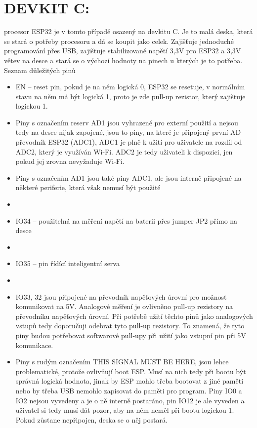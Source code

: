 \documentclass{template/socthesis}
\begin{document}
	\section{DEVKIT C:}
	procesor ESP32 je v tomto případě osazený na devkitu C. Je to malá deska, která se stará o potřeby procesoru a dá se koupit jako celek. Zajišťuje jednoduché programování přes USB, zajištuje stabilizované napětí 3,3V pro ESP32 a 3,3V větev na desce a stará se o výchozí hodnoty na pinech u kterých je to potřeba.
	Seznam důležitých pinů
	\begin{itemize}
	\item EN – reset pin, pokud je na něm logická 0, ESP32 se resetuje, v normálním stavu na něm má být logická 1, proto je zde pull-up rezistor, který zajištuje logickou 1.
	
	\item Piny s označením reserv AD1 jsou vyhrazené pro externí použití 
	a nejsou tedy na desce nijak zapojené, jsou to piny, na které je připojený 
	první AD převodník ESP32 (ADC1), ADC1 je plně k užití pro uživatele na rozdíl 
	od ADC2, který je využíván Wi-Fi. ADC2 je tedy uživateli k dispozici, jen pokud jej zrovna nevyžaduje Wi-Fi.
	
	\item Piny s označením AD1 jsou také piny ADC1, ale jsou interně připojené na některé periferie, která však nemusí být použité
	
	\item \item IO34 – použitelná na měření napětí na baterii přes jumper JP2 přímo na desce
	\item \item IO35 – pin řídící inteligentní serva
	\item \item IO33, 32 jsou připojené na převodník napěťových úrovní pro možnost komunikovat na 5V. Analogové měření je ovlivněno pull-up rezistory na převodníku napěťových úrovní. Při potřebě užití těchto pinů jako analogových vstupů tedy doporučuji odebrat tyto pull-up rezistory. 
	To znamená, že tyto piny budou potřebovat softwarové pull-upy při užití jako vstupní pin při 5V komunikace.
	\item Piny s rudým označením THIS SIGNAL MUST BE HERE, jsou lehce problematické, protože ovlivňují boot ESP. Musí na nich tedy při bootu být správná logická hodnota, jinak by ESP mohlo třeba bootovat z jiné paměti nebo by třeba USB nemohlo zapisovat do paměti pro program. Piny IO0 a IO2 nejsou vyvedeny a je o ně interně postaráno, pin IO12 je ale vyveden a uživatel si tedy musí dát pozor, aby na něm neměl při bootu logickou 1. Pokud zůstane nepřipojen, deska se o něj postará.
	

\end{itemize}
\end{document}
